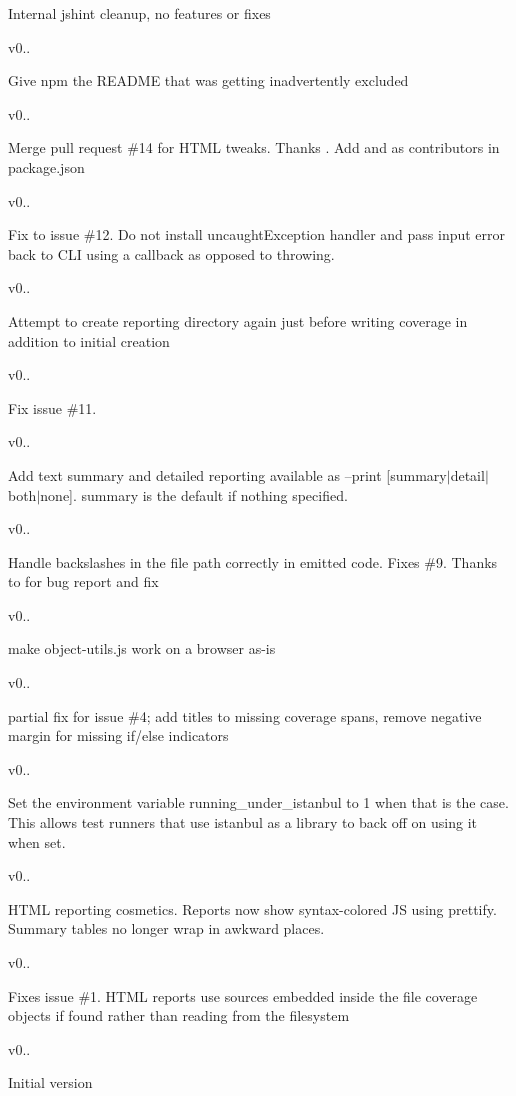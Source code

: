Internal jshint cleanup, no features or fixes 

v0..

Give npm the R\+E\+A\+D\+M\+E that was getting inadvertently excluded 

v0..

Merge pull request \#14 for H\+T\+M\+L tweaks. Thanks . Add  and  as contributors in {\ttfamily package.\+json} 

v0..

Fix to issue \#12. Do not install {\ttfamily uncaught\+Exception} handler and pass input error back to C\+L\+I using a callback as opposed to throwing. 

v0..

Attempt to create reporting directory again just before writing coverage in addition to initial creation 

v0..

Fix issue \#11. 

v0..

Add text summary and detailed reporting available as --print \mbox{[}summary$\vert$detail$\vert$both$\vert$none\mbox{]}. summary is the default if nothing specified. 

v0..

Handle backslashes in the file path correctly in emitted code. Fixes \#9. Thanks to  for bug report and fix 

v0..

make object-\/utils.\+js work on a browser as-\/is 

v0..

partial fix for issue \#4; add titles to missing coverage spans, remove negative margin for missing if/else indicators 

v0..

Set the environment variable running\+\_\+under\+\_\+istanbul to 1 when that is the case. This allows test runners that use istanbul as a library to back off on using it when set. 

v0..

H\+T\+M\+L reporting cosmetics. Reports now show syntax-\/colored J\+S using {\ttfamily prettify}. Summary tables no longer wrap in awkward places. 

v0..

Fixes issue \#1. H\+T\+M\+L reports use sources embedded inside the file coverage objects if found rather than reading from the filesystem 

v0..

Initial version  